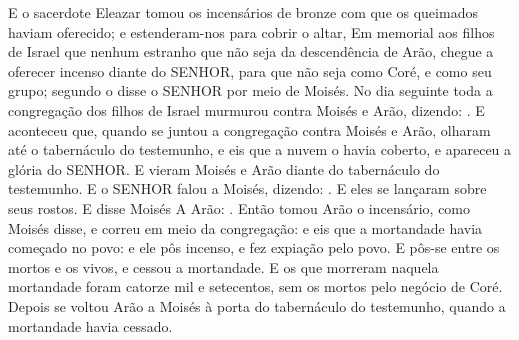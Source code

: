 {  E o sacerdote Eleazar tomou os incensários de bronze com que os queimados haviam oferecido; e estenderam-nos para cobrir o altar,
  Em memorial aos filhos de Israel que nenhum estranho que não seja da descendência de Arão, chegue a oferecer incenso diante do SENHOR, para que não seja como Coré, e como seu grupo; segundo o disse o SENHOR por meio de Moisés. %
  No dia seguinte toda a congregação dos filhos de Israel murmurou contra Moisés e Arão, dizendo: .
  E aconteceu que, quando se juntou a congregação contra Moisés e Arão, olharam até o tabernáculo do testemunho, e eis que a nuvem o havia coberto, e apareceu a glória do SENHOR.
  E vieram Moisés e Arão diante do tabernáculo do testemunho.
  E o SENHOR falou a Moisés, dizendo:
  . E eles se lançaram sobre seus rostos.
  E disse Moisés A Arão: .
  Então tomou Arão o incensário, como Moisés disse, e correu em meio da congregação: e eis que a mortandade havia começado no povo: e ele pôs incenso, e fez expiação pelo povo.
  E pôs-se entre os mortos e os vivos, e cessou a mortandade.
  E os que morreram naquela mortandade foram catorze mil e setecentos, sem os mortos pelo negócio de Coré.
  Depois se voltou Arão a Moisés à porta do tabernáculo do testemunho, quando a mortandade havia cessado.
\par }

